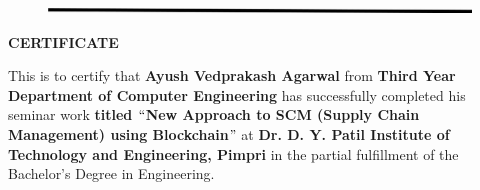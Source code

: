 \documentclass[12pt]{article}
\begin{document}

\begin{figure}[H]
\advance\leftskip 0.0in		\includegraphics[width=6.25in,height=0.07in]{./media/image3.jpeg}
\end{figure}



\par


\vspace{\baselineskip}

\vspace{\baselineskip}


\begin{adjustwidth}{0.0in}{-0.21in}
\begin{Center}
{\fontsize{16pt}{19.2pt}\selectfont \textbf{CERTIFICATE}\par}
\end{Center}\par

\end{adjustwidth}


\vspace{\baselineskip}
\begin{adjustwidth}{0.1in}{0.0in}
This is to certify that \textbf{Ayush Vedprakash Agarwal} from \textbf{Third Year Department of Computer Engineering} has successfully completed his seminar work \textbf{titled $``$New Approach to SCM (Supply Chain Management) using Blockchain$"$  }at \textbf{Dr. D. Y. Patil Institute of Technology and Engineering, Pimpri} in the partial fulfillment of the Bachelor’s Degree in Engineering.\par

\end{adjustwidth}


\vspace{\baselineskip}

\vspace{\baselineskip}

\vspace{\baselineskip}

\vspace{\baselineskip}

\vspace{\baselineskip}
\end{document}
